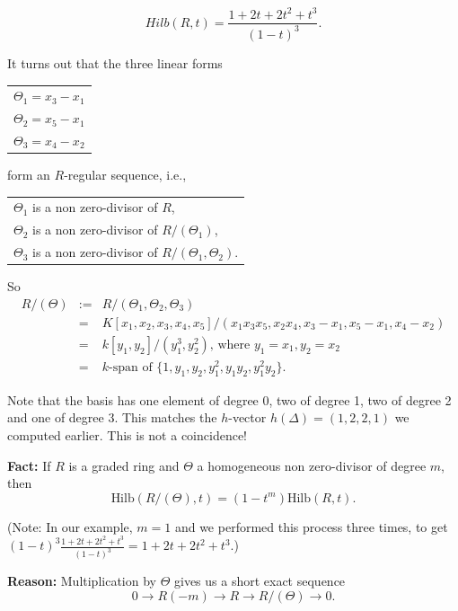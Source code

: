 \documentclass{amsart}
\begin{document}
$$Hilb(R,t) = \frac{1 + 2t + 2t^2 + t^3}{(1 - t)^3}.$$

It turns out that the three linear forms

\begin{center}
\begin{tabular}{l}
$\Theta_1 = x_3 - x_1$ \\
$\Theta_2 = x_5 - x_1$ \\
$\Theta_3 = x_4 - x_2$ \\
\end{tabular}
\end{center}

form an $R$-regular sequence, i.e.,

\begin{center}
\begin{tabular}{l}
$\Theta_1$ is a non zero-divisor of $R$, \\
$\Theta_2$ is a non zero-divisor of $R/(\Theta_1)$, \\
$\Theta_3$ is a non zero-divisor of $R/(\Theta_1, \Theta_2)$. \\
\end{tabular}
\end{center}

So
\begin{eqnarray}
R/(\Theta) & := & R/(\Theta_1, \Theta_2, \Theta_3) \nonumber \\
& = & K[x_1, x_2, x_3, x_4, x_5]/(x_1 x_3 x_5, x_2 x_4, x_3 - x_1, x_5 - 
x_1, x_4 - x_2) \nonumber \\
& = & k[y_1, y_2]/(y_1^3, y_2^2) \textrm{, where } y_1 = x_1, y_2 = x_2 \nonumber \\
& = & k \textrm{-span of } \{1, y_1, y_2, y_1^2, y_1 y_2, y_1^2 y_2 \}. \nonumber
\end{eqnarray}

Note that the basis has one element of degree 0, two of degree 1, two of 
degree 2 and one of degree 3. This matches the $h$-vector $h(\Delta) = 
(1, 2, 2, 1)$ we computed earlier. This is not a coincidence!


{\bf Fact:} If $R$ is a graded ring and $\Theta$ a homogeneous non zero-divisor of 
degree $m$, then
$$\textrm{Hilb}(R/(\Theta),t) = (1 - t^m)\textrm{Hilb}(R,t).$$

(Note: In our example, $m=1$ and we performed this process three times, to get 
$(1-t)^3 \frac{1 + 2t + 2t^2 + t^3}{(1-t)^3} = 1 + 2t + 2t^2 + t^3$.)

{\bf Reason:} Multiplication by $\Theta$ gives us a short exact sequence
$$0 \rightarrow R(-m) \rightarrow R \rightarrow R/(\Theta) \rightarrow 0.$$
\end{document}
